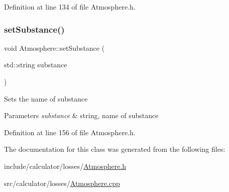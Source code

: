 Definition at line 134 of file Atmosphere.\+h.

\mbox{\label{class_atmosphere_aa92f55a1f07304f3e57fdfb8ece65d82}} 
\subsubsection{\texorpdfstring{set\+Substance()}{setSubstance()}}
{\footnotesize\ttfamily void Atmosphere\+::set\+Substance (\begin{DoxyParamCaption}\item[{std\+::string}]{substance }\end{DoxyParamCaption})\hspace{0.3cm}{\ttfamily [inline]}}

Sets the name of substance 
\begin{DoxyParams}{Parameters}
{\em substance} & string, name of substance \\
\hline
\end{DoxyParams}


Definition at line 156 of file Atmosphere.\+h.



The documentation for this class was generated from the following files\+:\begin{DoxyCompactItemize}
\item 
include/calculator/losses/\hyperlink{_atmosphere_8h}{Atmosphere.\+h}\item 
src/calculator/losses/\hyperlink{_atmosphere_8cpp}{Atmosphere.\+cpp}\end{DoxyCompactItemize}
